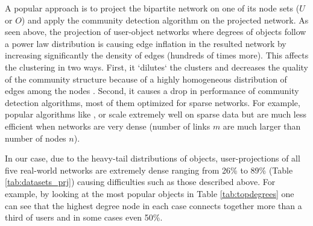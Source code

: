 A popular approach is to project the bipartite network on one of its node sets
($U$ or $O$) and apply the community detection algorithm on the projected
network. As seen above, the projection of user-object networks where degrees of
objects follow a power law distribution is causing edge inflation in the
resulted network by increasing significantly the density of edges (hundreds of
times more). This affects the clustering in two ways. First, it `dilutes` the
clusters and decreases the quality of the community structure because of a
highly homogeneous distribution of edges among the nodes
\citep{fortunato2010community}. Second, it causes a drop in performance of
community detection algorithms, most of them optimized for sparse networks. For
example, popular algorithms like \citet{clauset2004finding},
\citet{raghavan2007near} or \citet{blondel2008fast} scale extremely well on
sparse data but are much less efficient when networks are very dense (number of
links $m$ are much larger than number of nodes $n$).

In our case, due to the heavy-tail distributions of objects, user-projections of
all five real-world networks are extremely dense ranging from 26\% to 89\%
(Table \ref{tab:datasets_prj}) causing difficulties such as those described
above. For example, by looking at the most popular objects in Table
\ref{tab:topdegrees} one can see that the highest degree node in each case
connects together more than a third of users and in some cases even 50\%.


